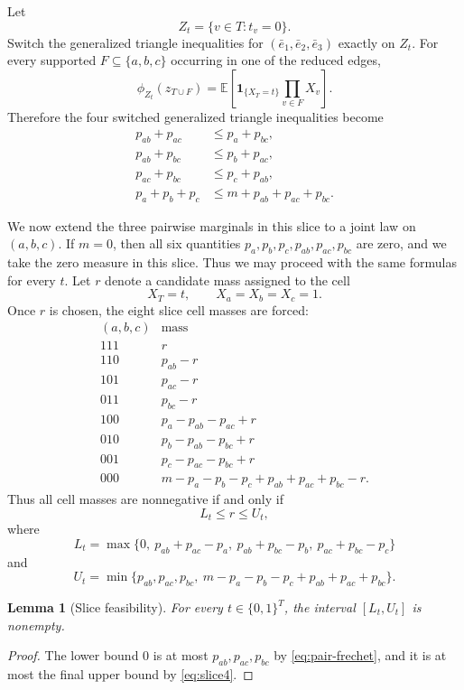 \documentclass[11pt]{article}
\newtheorem{lemma}[theorem]{Lemma}
\theoremstyle{definition}
\theoremstyle{remark}
\newcommand{\E}{\mathbb{E}}
\begin{document}
\begin{editedaiblock}
Let
\[
Z_t=\{v\in T:t_v=0\}.
\]
Switch the generalized triangle inequalities for $(\bar e_1,\bar e_2,\bar e_3)$ exactly on $Z_t$. For every supported $F\subseteq\{a,b,c\}$ occurring in one of the reduced edges,
\[
\phi_{Z_t}(z_{T\cup F})
=
\E\left[\mathbf 1_{\{X_T=t\}}\prod_{v\in F}X_v\right].
\]
Therefore the four switched generalized triangle inequalities become
\begin{align}
p_{ab}+p_{ac}&\le p_a+p_{bc},\label{eq:slice1}\\
p_{ab}+p_{bc}&\le p_b+p_{ac},\label{eq:slice2}\\
p_{ac}+p_{bc}&\le p_c+p_{ab},\label{eq:slice3}\\
p_a+p_b+p_c&\le m+p_{ab}+p_{ac}+p_{bc}.\label{eq:slice4}
\end{align}

We now extend the three pairwise marginals in this slice to a joint law on $(a,b,c)$. If $m=0$, then all six quantities $p_a,p_b,p_c,p_{ab},p_{ac},p_{bc}$ are zero, and we take the zero measure in this slice. Thus we may proceed with the same formulas for every $t$. Let $r$ denote a candidate mass assigned to the cell
\[
X_T=t,\qquad X_a=X_b=X_c=1.
\]
Once $r$ is chosen, the eight slice cell masses are forced:
\[
\begin{array}{c|c}
(a,b,c) & \text{mass}\\
\hline
111 & r\\
110 & p_{ab}-r\\
101 & p_{ac}-r\\
011 & p_{bc}-r\\
100 & p_a-p_{ab}-p_{ac}+r\\
010 & p_b-p_{ab}-p_{bc}+r\\
001 & p_c-p_{ac}-p_{bc}+r\\
000 & m-p_a-p_b-p_c+p_{ab}+p_{ac}+p_{bc}-r.
\end{array}
\]
Thus all cell masses are nonnegative if and only if
\[
L_t\le r\le U_t,
\]
where
\[
L_t=\max\{0,\ p_{ab}+p_{ac}-p_a,\ p_{ab}+p_{bc}-p_b,\ p_{ac}+p_{bc}-p_c\}
\]
and
\[
U_t=\min\{p_{ab},p_{ac},p_{bc},\ m-p_a-p_b-p_c+p_{ab}+p_{ac}+p_{bc}\}.
\]

\begin{lemma}[Slice feasibility]\label{lem:slice}
For every $t\in\{0,1\}^T$, the interval $[L_t,U_t]$ is nonempty.
\end{lemma}

\begin{proof}
The lower bound $0$ is at most $p_{ab},p_{ac},p_{bc}$ by \eqref{eq:pair-frechet}, and it is at most the final upper bound by \eqref{eq:slice4}.


\end{proof}
\end{editedaiblock}
\end{document}
